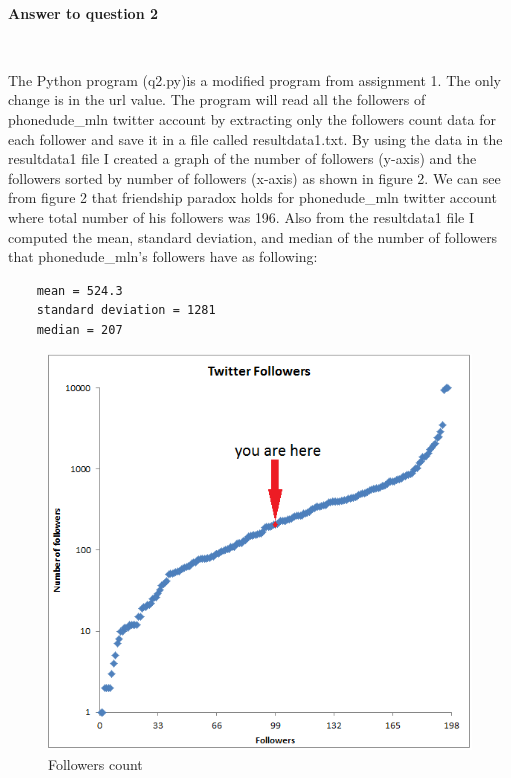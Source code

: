 \documentclass[a4paper,12pt]{article}
\begin{document}
$\:$


\textbf{Answer to question 2}

$\:$

\par
The Python program (q2.py)\footnotemark[1] is a modified program from assignment 1. The only change is in the url value. The program will read all the followers of phonedude\_mln twitter account by extracting only the followers count data for each follower and save it in a file called resultdata1.txt\footnotemark[1]. By using the data in the resultdata1 file I created a graph of the number of followers (y-axis) and the followers sorted by number of followers (x-axis) as shown in figure 2. We can see from figure 2 that friendship paradox holds for phonedude\_mln twitter account where total number of his followers was 196. Also from the resultdata1 file I computed the mean, standard deviation, and median of the number of followers that phonedude\_mln's followers have as following:

\begin{lstlisting}
	mean = 524.3
	standard deviation = 1281
	median = 207
\end{lstlisting}

\par

\begin{figure}
	\center
		\includegraphics[width=\linewidth]{TwittersFollowers.png} 
	\caption{Followers count}
\end{figure}
\end{document}
